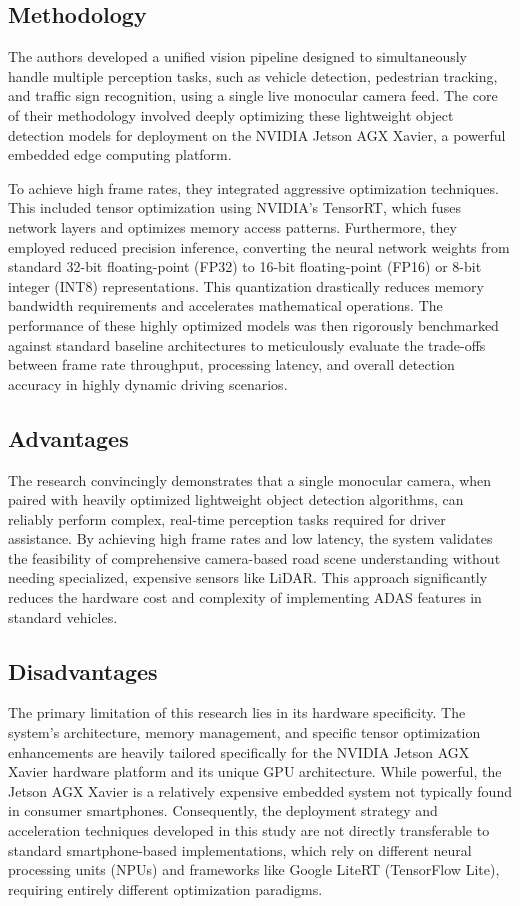 \subsection{Methodology}
The authors developed a unified vision pipeline designed to simultaneously handle multiple perception tasks, such as vehicle detection, pedestrian tracking, and traffic sign recognition, using a single live monocular camera feed. The core of their methodology involved deeply optimizing these lightweight object detection models for deployment on the NVIDIA Jetson AGX Xavier, a powerful embedded edge computing platform. 

To achieve high frame rates, they integrated aggressive optimization techniques. This included tensor optimization using NVIDIA's TensorRT, which fuses network layers and optimizes memory access patterns. Furthermore, they employed reduced precision inference, converting the neural network weights from standard 32-bit floating-point (FP32) to 16-bit floating-point (FP16) or 8-bit integer (INT8) representations. This quantization drastically reduces memory bandwidth requirements and accelerates mathematical operations. The performance of these highly optimized models was then rigorously benchmarked against standard baseline architectures to meticulously evaluate the trade-offs between frame rate throughput, processing latency, and overall detection accuracy in highly dynamic driving scenarios.

\subsection{Advantages}
The research convincingly demonstrates that a single monocular camera, when paired with heavily optimized lightweight object detection algorithms, can reliably perform complex, real-time perception tasks required for driver assistance. By achieving high frame rates and low latency, the system validates the feasibility of comprehensive camera-based road scene understanding without needing specialized, expensive sensors like LiDAR. This approach significantly reduces the hardware cost and complexity of implementing ADAS features in standard vehicles.

\subsection{Disadvantages}
The primary limitation of this research lies in its hardware specificity. The system's architecture, memory management, and specific tensor optimization enhancements are heavily tailored specifically for the NVIDIA Jetson AGX Xavier hardware platform and its unique GPU architecture. While powerful, the Jetson AGX Xavier is a relatively expensive embedded system not typically found in consumer smartphones. Consequently, the deployment strategy and acceleration techniques developed in this study are not directly transferable to standard smartphone-based implementations, which rely on different neural processing units (NPUs) and frameworks like Google LiteRT (TensorFlow Lite), requiring entirely different optimization paradigms.

